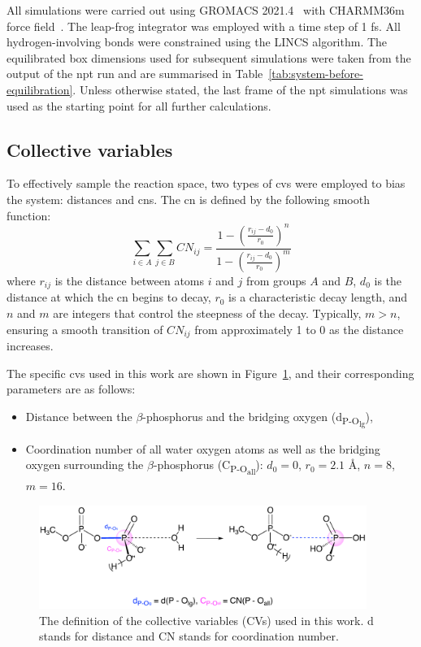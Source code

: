 All simulations were carried out using GROMACS 2021.4~\citep{abrahamGROMACSHighPerformance2015} with CHARMM36m force field~\citep{huangCHARMM36mImprovedForce2017}. The leap-frog integrator was employed with a time step of 1 fs. All hydrogen-involving bonds were constrained using the LINCS algorithm. The equilibrated box dimensions used for subsequent simulations were taken from the output of the \ac{npt} run and are summarised in Table~\ref{tab:system-before-equilibration}. Unless otherwise stated, the last frame of the \ac{npt} simulations was used as the starting point for all further calculations.



\subsection{Collective variables}
To effectively sample the reaction space, two types of \acp{cv} were employed to bias the system: distances and \acp{cn}. The \ac{cn} is defined by the following smooth function:
\begin{equation}
    \sum_{i \in A} \sum_{j \in B} CN_{ij} = \frac{1 - \left( \frac{r_{ij} - d_0}{r_0} \right)^n}{1 - \left( \frac{r_{ij} - d_0}{r_0} \right)^m}
    \label{eq:coordination_number}
\end{equation}
where $r_{ij}$ is the distance between atoms $i$ and $j$ from groups $A$ and $B$, $d_0$ is the distance at which the \ac{cn} begins to decay, $r_0$ is a characteristic decay length, and $n$ and $m$ are integers that control the steepness of the decay. Typically, $m > n$, ensuring a smooth transition of $CN_{ij}$ from approximately 1 to 0 as the distance increases.

The specific \acp{cv} used in this work are shown in Figure~\ref{fig:collective_variables}, and their corresponding parameters are as follows:

\begin{itemize}
    \item Distance between the $\beta$-phosphorus and the bridging oxygen (d\textsubscript{P-O\textsubscript{lg}}),
    \item Coordination number of all water oxygen atoms as well as the bridging oxygen surrounding the $\beta$-phosphorus (C\textsubscript{P-O\textsubscript{all}}): $d_0 = 0$, $r_0 = 2.1$ \AA, $n = 8$, $m = 16$.
\end{itemize}

\begin{figure}[b!]
    \centering
    \includegraphics[width=0.95\textwidth]{Figures/3_Computational_details/methods_collective_variables.pdf}
    \caption{The definition of the collective variables (CVs) used in this work. d stands for distance and CN stands for coordination number.}
    \label{fig:collective_variables}
\end{figure}

